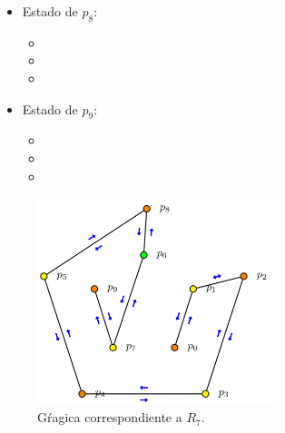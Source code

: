 \begin{multicols}{2}
\begin{itemize}
\begin{itemize}
      \item {}
      \end{itemize}

\item Estado de $p_8$:
      \begin{itemize}
      \item {}
      
      \item {}
      
      \item {}
      \end{itemize}

\item Estado de $p_9$:
      \begin{itemize}
      \item {}
      
      \item {}
      
      \item {}
      \end{itemize}

\end{itemize}
\end{multicols} 
\newpage

\begin{figure}[ht]
        \begin{center}
                \includegraphics[width=7cm]{RD7.png}
                \caption{Gŕagica correspondiente a $R_7$.}
        \end{center}
\end{figure}

